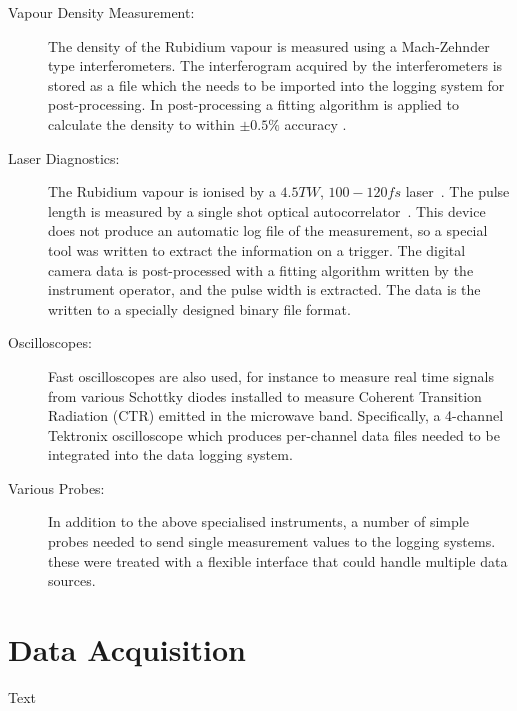 \begin{description}
    \item[Vapour Density Measurement:]
    The density of the Rubidium vapour is measured using a Mach-Zehnder type interferometers.
    The interferogram acquired by the interferometers is stored as a file which the needs to be imported into the logging system for post-processing.
    In post-processing a fitting algorithm is applied to calculate the density to within $\pm0.5\%$ accuracy \cite{oz:2016}.
    
    \item[Laser Diagnostics:]
    The Rubidium vapour is ionised by a $4.5\unit{TW}$, $100-120\unit{fs}$ laser~\cite{gschwendtner:2016}.
    The pulse length is measured by a single shot optical autocorrelator~\cite{salin:1987}.
    This device does not produce an automatic log file of the measurement, so a special tool was written to extract the information on a trigger.
    The digital camera data is post-processed with a fitting algorithm written by the instrument operator, and the pulse width is extracted.
    The data is the written to a specially designed binary file format.
    
    \item[Oscilloscopes:]
    Fast oscilloscopes are also used, for instance to measure real time signals from various Schottky diodes installed to measure Coherent Transition Radiation (CTR) emitted in the microwave band.
    Specifically, a 4-channel Tektronix oscilloscope which produces per-channel data files needed to be integrated into the data logging system.
    
    \item[Various Probes:]
    In addition to the above specialised instruments, a number of simple probes needed to send single measurement values to the logging systems.
    these were treated with a flexible interface that could handle multiple data sources.
\end{description}

\section{Data Acquisition}
\label{DAQ:DAQ}

Text

